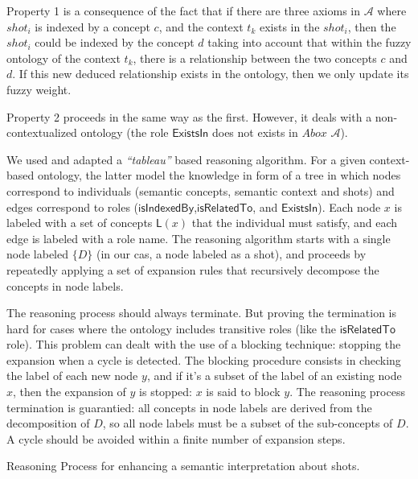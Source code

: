 		Property 1 is a consequence of the fact that if there are three
		axioms in $\mathcal{A}$ where $shot_{i}$ is indexed by a 
		concept $c$, and the context $t_{k}$ exists in the $shot_{i}$, 
		then the $shot_{i}$ could be indexed by the concept $d$ taking into account that within the 
		fuzzy ontology of the context $t_{k}$, there is a relationship between the two concepts $c$ and $d$.
		If this new deduced relationship exists in the ontology, then we only update its fuzzy weight.
		
		Property 2 proceeds in the same way as the first. However, it deals with 
		a non-contextualized ontology (the role $\mathsf{ExistsIn}$ does not exists in $Abox$ $\mathcal{A}$).
		
		We used and adapted a \emph{“tableau”} based reasoning algorithm.
For a given context-based ontology, the latter model the knowledge in form of 
a tree in which nodes correspond to individuals (semantic concepts, semantic context and shots) 
and edges correspond to roles ($\mathsf{isIndexedBy}$,$\mathsf{isRelatedTo}$,
and $\mathsf{ExistsIn}$).
Each node $x$ is labeled with a set of concepts $\mathsf{L}(x)$ that the
individual must satisfy, and each edge is labeled with a role name.
The reasoning algorithm starts with a single node labeled $\{D\}$ (in our cas, a
node labeled as a shot), and proceeds by repeatedly applying a set of expansion 
rules that recursively decompose the concepts in node labels.

The reasoning process should 
always terminate. But proving the termination is hard for cases where the ontology includes 
transitive roles (like the $\mathsf{isRelatedTo}$ role). This problem can dealt with the use 
of a blocking technique: stopping the expansion when a cycle is detected. The blocking 
procedure consists in checking the label of each new node $y$, and if it's a subset of the 
label of an existing node $x$, then the expansion of $y$ is stopped: $x$ is said to block $y$.
 The reasoning process termination is guarantied: all concepts in node labels are derived 
 from the decomposition of $D$, so all node labels must be a subset of the sub-concepts of $D$. 
A cycle should be avoided within a finite number of expansion steps.


\begin{algorithm}
			\label{algo112}
			\SetAlgoLined
			\caption{Reasoning Process for enhancing a semantic interpretation about
			shots.}
		\end{algorithm}
		
